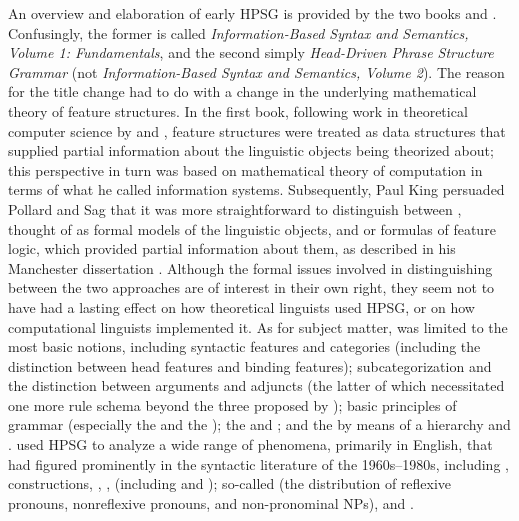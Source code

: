 \documentclass[output=paper]{langsci/langscibook}
\begin{document}
An overview and elaboration of early HPSG is provided by the two books \citet{ps} and \citet{ps2}. Confusingly, the former is called \textit{Information-Based Syntax and Semantics, Volume 1: Fundamentals}, and the second simply \textit{Head-Driven Phrase Structure Grammar} (not \textit{Information-Based Syntax and Semantics, Volume 2}). The reason for the title change had to do with a change in the underlying mathematical theory of feature structures. In the first book, following work in theoretical computer science by \citet{RoundsKasper1986} and \citet{MoshierRounds1987}, feature structures were treated as data structures that supplied partial information about the linguistic objects being theorized about; this perspective in turn was based on  mathematical theory of computation in terms of what he called information systems. Subsequently, Paul King persuaded Pollard and Sag that it was more straightforward to distinguish between , thought of as formal models of the linguistic objects, and  or formulas of feature logic, which provided partial information about them, as described in his Manchester dissertation \citep{King89}.  Although the formal issues involved in distinguishing between the two approaches are of interest in their own right, they seem not to have had a lasting effect on how theoretical linguists used HPSG, or on how computational linguists implemented it. As for subject matter, \citet{ps} was limited to the most basic notions, including syntactic features and categories (including the distinction between head features and binding features); subcategorization and the distinction between arguments and adjuncts (the latter of which necessitated one more rule schema beyond the three proposed by \citet{Pollard85a-u}); basic principles of grammar (especially the  and the ); the  and ; and the  by means of a  hierarchy and . \citet{ps2} used HPSG to analyze a wide range of phenomena, primarily in English, that had figured prominently in the syntactic literature of the 1960s--1980s, including ,  constructions, , ,  (including  and ); so-called  (the distribution of reflexive pronouns, nonreflexive pronouns, and non-pronominal NPs), and .
\end{document}
